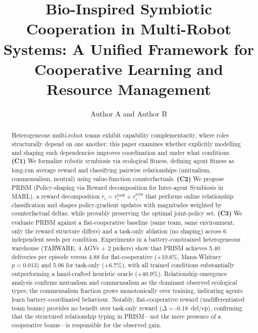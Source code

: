 \documentclass[Afour,sageh,times]{sagej}
\begin{document}

\title{Bio-Inspired Symbiotic Cooperation in Multi-Robot Systems: A Unified Framework for Cooperative Learning and Resource Management}

\author{Author A and Author B} %
 


\begin{abstract}
Heterogeneous multi-robot teams exhibit capability complementarity, where roles structurally depend on one another; this paper examines whether explicitly modelling and shaping such dependencies improves coordination and under what conditions.
\textbf{(C1)} We formalize robotic symbiosis via ecological fitness, defining agent fitness as long-run average reward and classifying pairwise relationships (mutualism, commensalism, neutral) using value-function counterfactuals.
\textbf{(C2)} We propose PRISM (Policy-shaping via Reward decomposition for Inter-agent Symbiosis in MARL), a reward decomposition $r_i = r_i^{\mathrm{task}} + r_i^{\mathrm{sym}}$ that performs online relationship classification and shapes policy-gradient updates with magnitudes weighted by counterfactual deltas, while provably preserving the optimal joint-policy set.
\textbf{(C3)} We evaluate PRISM against a flat-cooperative baseline (same team, same environment, only the reward structure differs) and a task-only ablation (no shaping) across 6 independent seeds per condition.
Experiments in a battery-constrained heterogeneous warehouse (TARWARE, 4 AGVs + 2 pickers) show that PRISM achieves 5.40 deliveries per episode versus 4.88 for flat-cooperative (+10.6\%, Mann-Whitney $p{=}0.013$) and 5.06 for task-only (+6.7\%), with all trained conditions substantially outperforming a hand-crafted heuristic oracle ($+40.9\%$). Relationship emergence analysis confirms mutualism and commensalism as the dominant observed ecological types; the commensalism fraction grows monotonically over training, indicating agents learn battery-coordinated behaviour. Notably, flat-cooperative reward (undifferentiated team bonus) provides no benefit over task-only reward ($\Delta{=}$-0.18~del/ep), confirming that the structured relationship typing in PRISM---not the mere presence of a cooperative bonus---is responsible for the observed gain.
\end{abstract}
\end{document}
